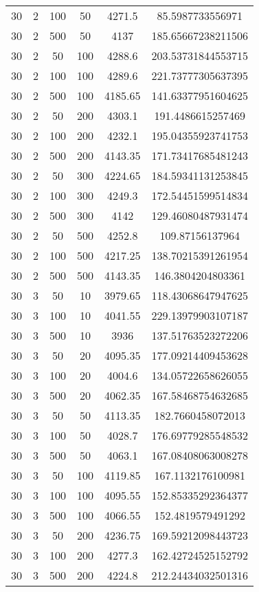 {\begin{longtabu}{S
S
S
S
S[round-mode=places, round-precision=0]
S[round-mode=places, round-precision=0]}
30 & 2 & 100 & 50 & 4271.5 & 85.5987733556971 \\
30 & 2 & 500 & 50 & 4137 & 185.65667238211506 \\
30 & 2 & 50 & 100 & 4288.6 & 203.53731844553715 \\
30 & 2 & 100 & 100 & 4289.6 & 221.73777305637395 \\
30 & 2 & 500 & 100 & 4185.65 & 141.63377951604625 \\
30 & 2 & 50 & 200 & 4303.1 & 191.4486615257469 \\
30 & 2 & 100 & 200 & 4232.1 & 195.04355923741753 \\
30 & 2 & 500 & 200 & 4143.35 & 171.73417685481243 \\
30 & 2 & 50 & 300 & 4224.65 & 184.59341131253845 \\
30 & 2 & 100 & 300 & 4249.3 & 172.54451599514834 \\
30 & 2 & 500 & 300 & 4142 & 129.46080487931474 \\
30 & 2 & 50 & 500 & 4252.8 & 109.87156137964 \\
30 & 2 & 100 & 500 & 4217.25 & 138.70215391261954 \\
30 & 2 & 500 & 500 & 4143.35 & 146.3804204803361 \\
30 & 3 & 50 & 10 & 3979.65 & 118.43068647947625 \\
30 & 3 & 100 & 10 & 4041.55 & 229.13979903107187 \\
30 & 3 & 500 & 10 & 3936 & 137.51763523272206 \\
30 & 3 & 50 & 20 & 4095.35 & 177.09214409453628 \\
30 & 3 & 100 & 20 & 4004.6 & 134.05722658626055 \\
30 & 3 & 500 & 20 & 4062.35 & 167.58468754632685 \\
30 & 3 & 50 & 50 & 4113.35 & 182.7660458072013 \\
30 & 3 & 100 & 50 & 4028.7 & 176.69779285548532 \\
30 & 3 & 500 & 50 & 4063.1 & 167.08408063008278 \\
30 & 3 & 50 & 100 & 4119.85 & 167.1132176100981 \\
30 & 3 & 100 & 100 & 4095.55 & 152.85335292364377 \\
30 & 3 & 500 & 100 & 4066.55 & 152.4819579491292 \\
30 & 3 & 50 & 200 & 4236.75 & 169.59212098443723 \\
30 & 3 & 100 & 200 & 4277.3 & 162.42724525152792 \\
30 & 3 & 500 & 200 & 4224.8 & 212.24434032501316 \\

\end{longtabu}}
